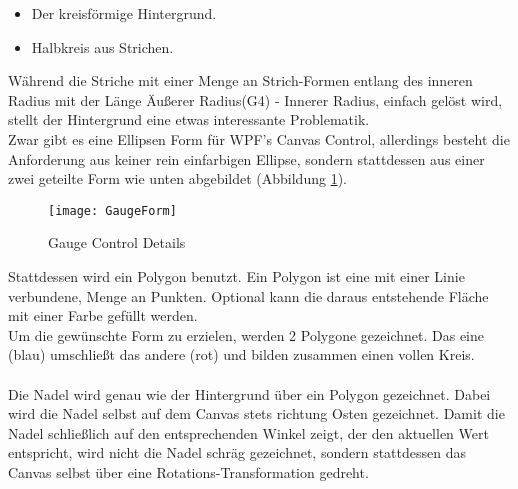 \begin{itemize}
	\item Der kreisförmige Hintergrund.
	\item Halbkreis aus Strichen.
\end{itemize}
Während die Striche mit einer Menge an Strich-Formen entlang des inneren Radius mit der Länge Äußerer Radius(G4) - Innerer Radius, einfach gelöst wird, stellt der Hintergrund eine etwas interessante Problematik.\\
Zwar gibt es eine Ellipsen Form für WPF's Canvas Control, allerdings besteht die Anforderung aus keiner rein einfarbigen Ellipse, sondern stattdessen aus einer zwei geteilte Form wie unten abgebildet (Abbildung \ref{fig:gauge2}).
\begin{figure}[ht]
	\centering
	\texttt{[image: GaugeForm]}
	\caption{Gauge Control Details}
	\label{fig:gauge2}
\end{figure}
Stattdessen wird ein Polygon benutzt. Ein Polygon ist eine mit einer Linie verbundene, Menge an Punkten. Optional kann die daraus entstehende Fläche mit einer Farbe gefüllt werden.\\
Um die gewünschte Form zu erzielen, werden 2 Polygone gezeichnet. Das eine (blau) umschließt das andere (rot) und bilden zusammen einen vollen Kreis.\\
\\
Die Nadel wird genau wie der Hintergrund über ein Polygon gezeichnet. Dabei wird die Nadel selbst auf dem Canvas stets richtung Osten gezeichnet. Damit die Nadel schließlich auf den entsprechenden Winkel zeigt, der den aktuellen Wert entspricht, wird nicht die Nadel schräg gezeichnet, sondern stattdessen das Canvas selbst über eine Rotations-Transformation gedreht.

